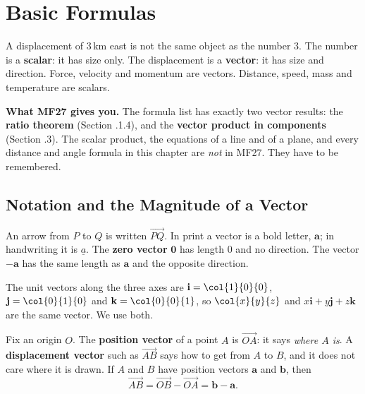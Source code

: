 \clearpage
\section{Basic Formulas}
A displacement of $3\,\mathrm{km}$ east is not the same object as the number $3$. The number is a \textbf{scalar}: it has size only. The displacement is a \textbf{vector}: it has size and direction. Force, velocity and momentum are vectors. Distance, speed, mass and temperature are scalars.

\begin{info}
\textbf{What MF27 gives you.} The formula list has exactly two vector results: the \textbf{ratio theorem} (Section \chapnum.1.4), and the \textbf{vector product in components} (Section \chapnum.3). The scalar product, the equations of a line and of a plane, and every distance and angle formula in this chapter are \emph{not} in MF27. They have to be remembered.
\end{info}

\subsection{Notation and the Magnitude of a Vector}
An arrow from $P$ to $Q$ is written $\overrightarrow{PQ}$. In print a vector is a bold letter, $\mathbf{a}$; in handwriting it is $\underline{a}$. The \textbf{zero vector} $\mathbf{0}$ has length $0$ and no direction. The vector $-\mathbf{a}$ has the same length as $\mathbf{a}$ and the opposite direction.

The unit vectors along the three axes are $\mathbf{i} = \col{1}{0}{0}$, \ $\mathbf{j} = \col{0}{1}{0}$ and $\mathbf{k} = \col{0}{0}{1}$, so $\col{x}{y}{z}$ and $x\mathbf{i} + y\mathbf{j} + z\mathbf{k}$ are the same vector. We use both.

Fix an origin $O$. The \textbf{position vector} of a point $A$ is $\overrightarrow{OA}$: it says \emph{where $A$ is}. A \textbf{displacement vector} such as $\overrightarrow{AB}$ says how to get from $A$ to $B$, and it does not care where it is drawn. If $A$ and $B$ have position vectors $\mathbf{a}$ and $\mathbf{b}$, then
\[
\overrightarrow{AB} = \overrightarrow{OB} - \overrightarrow{OA} = \mathbf{b} - \mathbf{a}.
\]

